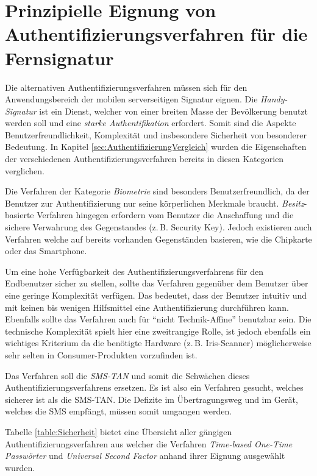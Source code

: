 \documentclass[11pt,a4paper,ngerman]{scrreprt}
\begin{document}
\section{Prinzipielle Eignung von Authentifizierungsverfahren für die Fernsignatur}\label{sec:eignung}
Die alternativen Authentifizierungsverfahren müssen sich für den Anwendungsbereich der mobilen serverseitigen Signatur eignen. Die \textit{Handy-Signatur} ist ein Dienst, welcher von einer breiten Masse der Bevölkerung benutzt werden soll und eine \emph{starke Authentifikation} erfordert. Somit sind die Aspekte Benutzerfreundlichkeit, Komplexität und insbesondere Sicherheit von besonderer Bedeutung. In Kapitel \ref{sec:AuthentifizierungVergleich} wurden die Eigenschaften der verschiedenen Authentifizierungsverfahren bereits in diesen Kategorien verglichen.
\begin{description}[font=\rmfamily]
    \item[Benutzerfreundlichkeit:] Die Verfahren der Kategorie \emph{Biometrie} sind besonders Benutzerfreundlich, da der Benutzer zur Authentifizierung nur seine körperlichen Merkmale braucht. \emph{Besitz}-basierte Verfahren hingegen erfordern vom Benutzer die Anschaffung und die sichere Verwahrung des Gegenstandes (z.\,B. Security Key). Jedoch existieren auch Verfahren welche auf bereits vorhanden Gegenständen basieren, wie die Chipkarte oder das Smartphone.
    \item[Komplexität:] Um eine hohe Verfügbarkeit des Authentifizierungsverfahrens für den Endbenutzer sicher zu stellen, sollte das Verfahren gegenüber dem Benutzer über eine geringe Komplexität verfügen. Das bedeutet, dass der Benutzer intuitiv und mit keinen bis wenigen Hilfsmittel eine Authentifizierung durchführen kann. Ebenfalls sollte das Verfahren auch für ``nicht Technik-Affine'' benutzbar sein. Die technische Komplexität spielt hier eine zweitrangige Rolle, ist jedoch ebenfalls ein wichtiges Kriterium da die benötigte Hardware (z.\,B. Iris-Scanner) möglicherweise sehr selten in Consumer-Produkten vorzufinden ist.
    \item[Sicherheit:] Das Verfahren soll die \textit{SMS-TAN} und somit die Schwächen dieses Authentifizierungsverfahrens ersetzen. Es ist also ein Verfahren gesucht, welches sicherer ist als die SMS-TAN. Die Defizite im Übertragungsweg und im Gerät, welches die SMS empfängt, müssen somit umgangen werden.
\end{description}
Tabelle \ref{table:Sicherheit} bietet eine Übersicht aller gängigen Authentifizierungsverfahren aus welcher die Verfahren \textit{Time-based One-Time Passwörter} und \textit{Universal Second Factor} anhand ihrer Eignung ausgewählt wurden.
\end{document}
